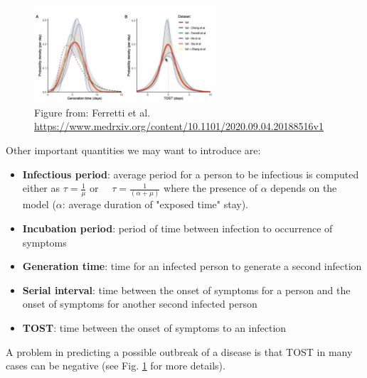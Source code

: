 \documentclass[../main/main.tex]{subfiles}
\begin{document}
\begin{figure}[h!]
\centering
\includegraphics[width=0.6\textwidth]{../lessons/image/02/4_TOST.png}
\caption{\label{fig:4_TOST} Figure from: Ferretti et al. \url{https://www.medrxiv.org/content/10.1101/2020.09.04.20188516v1}}
\end{figure}



Other important quantities we may want to introduce are:

\begin{itemize}
    \item \textbf{Infectious period}: average period for a person to be infectious is computed either as $ \tau = \frac{1}{\mu }$ or $\quad \tau = \frac{1}{(\alpha + \mu )} $ where the presence of $\alpha$ depends on the model ($\alpha$: average duration of "exposed time" stay).
    \item \textbf{Incubation period}: period of time between infection to occurrence of symptoms
    \item \textbf{Generation time}: time for an infected person to generate a second infection
    \item \textbf{Serial interval}: time between the onset of symptoms for a person and the onset of symptoms for another second infected person
    \item \textbf{TOST}: time between the onset of symptoms to an infection
    
\end{itemize}
A problem in predicting a possible outbreak of a disease is that TOST in many cases can be negative (see Fig. \ref{fig:4_TOST} for more details).
\end{document}
